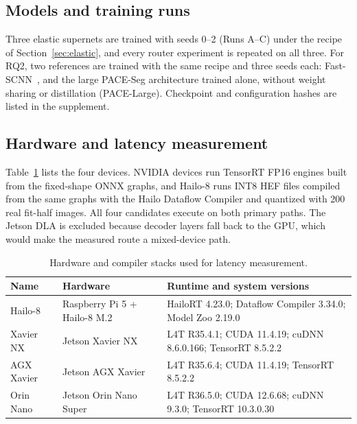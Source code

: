 \documentclass[a4paper,5p]{elsarticle}
\newcommand{\method}{PACE-Seg}
\begin{document}
\subsection{Models and training runs}

Three elastic supernets are trained with seeds 0--2 (Runs A--C) under the recipe of Section~\ref{sec:elastic}, and every router experiment is repeated on all three. For RQ2, two references are trained with the same recipe and three seeds each: Fast-SCNN~\cite{poudel2019fastscnn}, and the large \method{} architecture trained alone, without weight sharing or distillation (PACE-Large). Checkpoint and configuration hashes are listed in the supplement.

\subsection{Hardware and latency measurement}

Table~\ref{tab:hardware} lists the four devices. NVIDIA devices run TensorRT FP16 engines built from the fixed-shape ONNX graphs, and Hailo-8 runs INT8 HEF files compiled from the same graphs with the Hailo Dataflow Compiler and quantized with 200 real fit-half images. All four candidates execute on both primary paths. The Jetson DLA is excluded because decoder layers fall back to the GPU, which would make the measured route a mixed-device path.

\begin{table}[!t]
\centering
\caption{Hardware and compiler stacks used for latency measurement.}
\label{tab:hardware}
\scriptsize
\begin{tabularx}{\columnwidth}{@{}l>{\raggedright\arraybackslash}p{2.1cm}>{\raggedright\arraybackslash}X@{}}
\toprule
Name & Hardware & Runtime and system versions \\
\midrule
Hailo-8 & Raspberry Pi 5 + Hailo-8 M.2 & HailoRT 4.23.0; Dataflow Compiler 3.34.0; Model Zoo 2.19.0 \\
Xavier NX & Jetson Xavier NX & L4T R35.4.1; CUDA 11.4.19; cuDNN 8.6.0.166; TensorRT 8.5.2.2 \\
AGX Xavier & Jetson AGX Xavier & L4T R35.6.4; CUDA 11.4.19; TensorRT 8.5.2.2 \\
Orin Nano & Jetson Orin Nano Super & L4T R36.5.0; CUDA 12.6.68; cuDNN 9.3.0; TensorRT 10.3.0.30 \\
\bottomrule
\end{tabularx}
\end{table}
\end{document}
